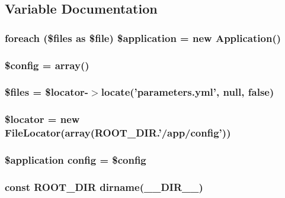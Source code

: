 \subsection{Variable Documentation}
\hypertarget{console_8php_a7242967b6822c078a655d9523d6b655e}{
\subsubsection[{\$application}]{\setlength{\rightskip}{0pt plus 5cm}foreach (\$files as \$file) \$application = new Application()}}\label{console_8php_a7242967b6822c078a655d9523d6b655e}
\hypertarget{console_8php_a49c7011be9c979d9174c52a8b83e5d8e}{
\subsubsection[{\$config}]{\setlength{\rightskip}{0pt plus 5cm}\${\bf config} = array()}}\label{console_8php_a49c7011be9c979d9174c52a8b83e5d8e}
\hypertarget{console_8php_a9590b15215a21e9b42eb546aeef79704}{
\subsubsection[{\$files}]{\setlength{\rightskip}{0pt plus 5cm}\$files = \$locator-\/$>$locate('parameters.\-yml', null, false)}}\label{console_8php_a9590b15215a21e9b42eb546aeef79704}
\hypertarget{console_8php_a419ed0241456843e2a5cfb383bfa7bdd}{
\subsubsection[{\$locator}]{\setlength{\rightskip}{0pt plus 5cm}\$locator = new File\-Locator(array(R\-O\-O\-T\-\_\-\-D\-I\-R.'/app/{\bf config}'))}}\label{console_8php_a419ed0241456843e2a5cfb383bfa7bdd}
\hypertarget{console_8php_ab3995301e58c6128ab5f58199b9c97f0}{
\subsubsection[{config}]{\setlength{\rightskip}{0pt plus 5cm}\$application config = \$config}}\label{console_8php_ab3995301e58c6128ab5f58199b9c97f0}
\hypertarget{console_8php_a377942368503b6977376ce180c12aeef}{
\subsubsection[{R\-O\-O\-T\-\_\-\-D\-I\-R}]{\setlength{\rightskip}{0pt plus 5cm}const R\-O\-O\-T\-\_\-\-D\-I\-R dirname(\-\_\-\-\_\-\-D\-I\-R\-\_\-\-\_\-)}}\label{console_8php_a377942368503b6977376ce180c12aeef}
